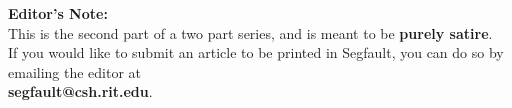 \documentclass[10pt]{extarticle} %
\begin{document}
\begin{minipage}[t]{.35\linewidth}
\begin{mdframed}[style=sidebar,frametitle={}]
\begin{enumerate}[leftmargin=0.2cm]
\end{enumerate}


\end{mdframed}
\vspace{10px}
\begin{mdframed}[style=sidebar,frametitle={}] %
\textbf{Editor's Note:} \\
This is the second part of a two part series, and is meant to be \textbf{purely satire}. \\
If you would like to submit an article to be printed in Segfault, you can do so by emailing the editor at \\ \textbf{segfault@csh.rit.edu}. 
\end{mdframed}
\end{minipage}\hfill %
%
%
\end{document}
